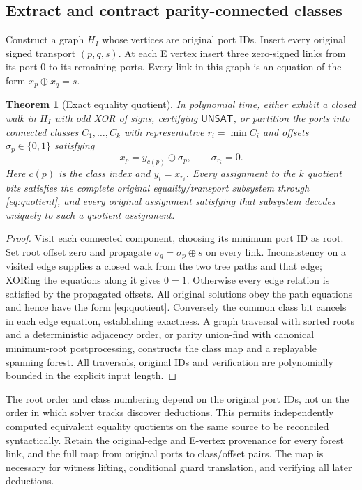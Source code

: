 \documentclass[11pt,letterpaper]{article}
\newtheorem{theorem}{Theorem}[section]
\theoremstyle{definition}
\newcommand{\UNSAT}{\ensuremath{\mathsf{UNSAT}}}
\newcommand{\bits}{\{0,1\}}
\begin{document}
\subsection{Extract and contract parity-connected classes}
Construct a graph \(H_I\) whose vertices are original port IDs. Insert every original signed transport \((p,q,s)\). At each E vertex insert three zero-signed links from its port 0 to its remaining ports. Every link in this graph is an equation of the form \(x_p\oplus x_q=s\).
\begin{theorem}[Exact equality quotient]\label{thm:quotient}
In polynomial time, either exhibit a closed walk in \(H_I\) with odd XOR of signs, certifying \(\UNSAT\), or partition the ports into connected classes \(C_1,\ldots,C_k\) with representative \(r_i=\min C_i\) and offsets \(\sigma_p\in\bits\) satisfying
\begin{equation}\label{eq:quotient}
 x_p=y_{c(p)}\oplus\sigma_p,\qquad \sigma_{r_i}=0.
\end{equation}
Here \(c(p)\) is the class index and \(y_i=x_{r_i}\). Every assignment to the \(k\) quotient bits satisfies the complete original equality/transport subsystem through \eqref{eq:quotient}, and every original assignment satisfying that subsystem decodes uniquely to such a quotient assignment.
\end{theorem}
\begin{proof}
Visit each connected component, choosing its minimum port ID as root. Set root offset zero and propagate \(\sigma_q=\sigma_p\oplus s\) on every link. Inconsistency on a visited edge supplies a closed walk from the two tree paths and that edge; XORing the equations along it gives \(0=1\). Otherwise every edge relation is satisfied by the propagated offsets. All original solutions obey the path equations and hence have the form \eqref{eq:quotient}. Conversely the common class bit cancels in each edge equation, establishing exactness. A graph traversal with sorted roots and a deterministic adjacency order, or parity union-find with canonical minimum-root postprocessing, constructs the class map and a replayable spanning forest. All traversals, original IDs and verification are polynomially bounded in the explicit input length.
\end{proof}
The root order and class numbering depend on the original port IDs, not on the order in which solver tracks discover deductions. This permits independently computed equivalent equality quotients on the same source to be reconciled syntactically. Retain the original-edge and E-vertex provenance for every forest link, and the full map from original ports to class/offset pairs. The map is necessary for witness lifting, conditional guard translation, and verifying all later deductions.
\end{document}
